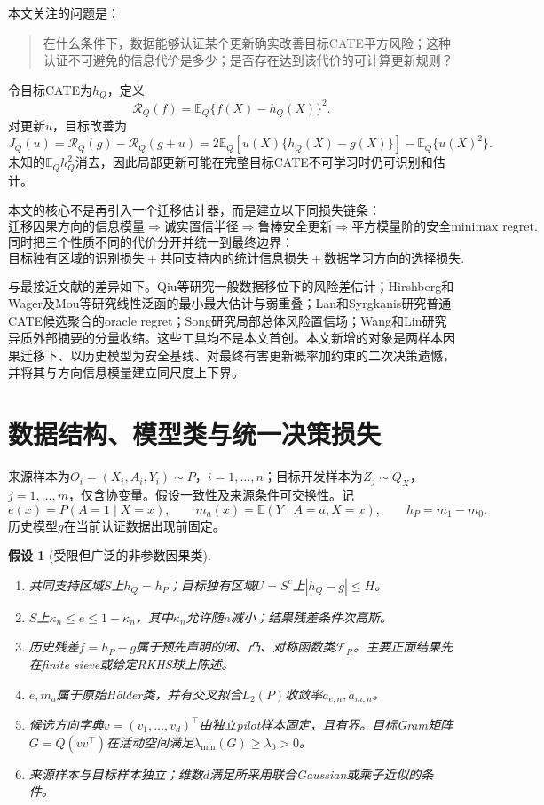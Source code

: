 \documentclass[UTF8,12pt]{ctexart}
\newtheorem{assumption}{假设}
\newcommand{\E}{\mathbb E}
\newcommand{\R}{\mathcal R}
\newcommand{\F}{\mathcal F}
\begin{document}
本文关注的问题是：
\begin{quote}
在什么条件下，数据能够认证某个更新确实改善目标CATE平方风险；这种认证不可避免的信息代价是多少；是否存在达到该代价的可计算更新规则？
\end{quote}

令目标CATE为$h_Q$，定义
\[
\R_Q(f)=\E_Q\{f(X)-h_Q(X)\}^2.
\]
对更新$u$，目标改善为
\begin{equation}
J_Q(u)=\R_Q(g)-\R_Q(g+u)
=2\E_Q[u(X)\{h_Q(X)-g(X)\}]-\E_Q\{u(X)^2\}.
\label{eq:gain}
\end{equation}
未知的$\E_Qh_Q^2$消去，因此局部更新可能在完整目标CATE不可学习时仍可识别和估计。

本文的核心不是再引入一个迁移估计器，而是建立以下同损失链条：
\[
\boxed{
\text{迁移因果方向的信息模量}
\Longrightarrow
\text{诚实置信半径}
\Longrightarrow
\text{鲁棒安全更新}
\Longrightarrow
\text{平方模量阶的安全minimax regret}.}
\]
同时把三个性质不同的代价分开并统一到最终边界：
\[
\boxed{
\text{目标独有区域的识别损失}
+
\text{共同支持内的统计信息损失}
+
\text{数据学习方向的选择损失}.}
\]

与最接近文献的差异如下。Qiu等研究一般数据移位下的风险差估计；Hirshberg和Wager及Mou等研究线性泛函的最小最大估计与弱重叠；Lan和Syrgkanis研究普通CATE候选聚合的oracle regret；Song研究局部总体风险置信场；Wang和Lin研究异质外部摘要的分量收缩。这些工具均不是本文首创。本文新增的对象是两样本因果迁移下、以历史模型为安全基线、对最终有害更新概率加约束的二次决策遗憾，并将其与方向信息模量建立同尺度上下界。

\section{数据结构、模型类与统一决策损失}
来源样本为$O_i=(X_i,A_i,Y_i)\sim P$，$i=1,\ldots,n$；目标开发样本为$Z_j\sim Q_X$，$j=1,\ldots,m$，仅含协变量。假设一致性及来源条件可交换性。记
\[
e(x)=P(A=1\mid X=x),\qquad
m_a(x)=\E(Y\mid A=a,X=x),\qquad
h_P=m_1-m_0.
\]
历史模型$g$在当前认证数据出现前固定。

\begin{assumption}[受限但广泛的非参数因果类]\label{ass:model}
\begin{enumerate}[label=(A\arabic*)]
\item 共同支持区域$S$上$h_Q=h_P$；目标独有区域$U=S^c$上$|h_Q-g|\le H$。
\item $S$上$\kappa_n\le e\le1-\kappa_n$，其中$\kappa_n$允许随$n$减小；结果残差条件次高斯。
\item 历史残差$f=h_P-g$属于预先声明的闭、凸、对称函数类$\F_R$。主要正面结果先在finite sieve或给定RKHS球上陈述。
\item $e,m_a$属于原始Hölder类，并有交叉拟合$L_2(P)$收敛率$a_{e,n},a_{m,n}$。
\item 候选方向字典$v=(v_1,\ldots,v_d)^\top$由独立pilot样本固定，且有界。目标Gram矩阵$G=Q(vv^\top)$在活动空间满足$\lambda_{\min}(G)\ge\lambda_0>0$。
\item 来源样本与目标样本独立；维数$d$满足所采用联合Gaussian或乘子近似的条件。
\end{enumerate}
\end{assumption}
\end{document}
